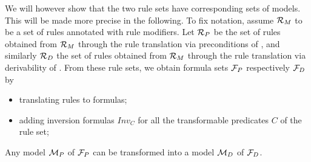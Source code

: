 We will however show that the two rule sets have corresponding sets of
models. This will be made more precise in the following. To fix notation,
assume ${\cal R}_M$ to be a set of rules annotated with rule modifiers. Let
${\cal R}_P$ be the set of rules obtained from ${\cal R}_M$ through the rule
translation via preconditions of , and similarly
${\cal R}_D$ the set of rules obtained from ${\cal R}_M$ through the rule
translation via derivability of . From these rule
sets, we obtain formula sets ${\cal F}_P$ respectively ${\cal F}_D$ by
\begin{itemize}
\item translating rules to formulas;
\item adding inversion formulas $Inv_C$ for all
  the transformable predicates $C$ of the rule set;
\end{itemize}


\begin{lemma}\label{lemma:mp_to_md}
  Any model ${\cal M}_P$ of ${\cal F}_P$ can be transformed into a model
  ${\cal M}_D$ of ${\cal F}_D$.
\end{lemma}

